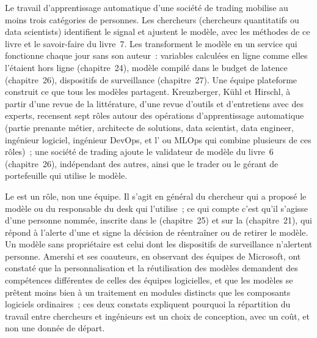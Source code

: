 Le travail d'apprentissage automatique d'une société de trading mobilise au moins trois catégories de personnes. Les chercheurs (chercheurs quantitatifs ou
data scientists) identifient le signal et ajustent le modèle, avec les méthodes de ce livre et le savoir-faire du livre~7. Les  transforment le modèle en un service qui fonctionne chaque jour sans son auteur~: variables calculées en ligne comme elles l'étaient hors ligne (chapitre~24),
modèle compilé dans le budget de latence (chapitre~26), dispositifs de surveillance (chapitre~27). Une équipe plateforme construit ce que tous les modèles partagent. Kreuzberger, Kühl et Hirschl,
à partir d'une revue de la littérature, d'une revue d'outils et d'entretiens avec des experts, recensent sept rôles autour des opérations d'apprentissage automatique (partie prenante métier,
architecte de solutions, data scientist, data engineer, ingénieur logiciel, ingénieur DevOps, et l' ou MLOps qui combine plusieurs de ces rôles)~;
une société de trading ajoute le validateur de modèle du livre~6 (chapitre~26), indépendant des autres, ainsi que le trader ou le gérant de portefeuille
qui utilise le modèle.

Le  est un rôle, non une équipe. Il s'agit en général du chercheur qui a proposé le modèle ou du responsable du desk qui l'utilise~; ce qui compte
c'est qu'il s'agisse d'une personne nommée, inscrite dans le  (chapitre~25) et sur la  (chapitre~21), qui répond à l'alerte d'une
 et signe la décision de réentraîner ou de retirer le modèle. Un modèle sans propriétaire est celui dont les dispositifs de surveillance n'alertent personne. Amershi et ses coauteurs, en observant des équipes de Microsoft, ont constaté
que la personnalisation et la réutilisation des modèles demandent des compétences différentes de celles des équipes logicielles, et que les modèles se prêtent moins bien à un traitement en modules distincts
que les composants logiciels ordinaires~; ces deux constats expliquent pourquoi la répartition du travail entre chercheurs et ingénieurs est un choix de conception, avec un coût,
et non une donnée de départ.

